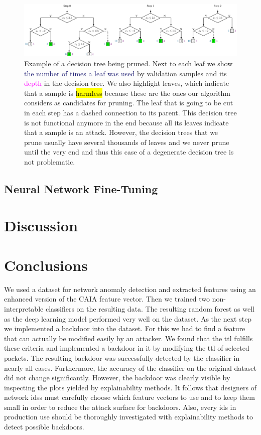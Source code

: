 \documentclass[10pt,sigconf,letterpaper,dvipsnames]{acmart}
\begin{document}
\begin{figure}[h]
\includegraphics[width=\textwidth]{pruning_example.pdf}

\caption{Example of a decision tree being pruned. Next to each leaf we show \textcolor{MidnightBlue}{the number of times a leaf was used} by validation samples and its \textcolor{Fuchsia}{depth} in the decision tree. We also highlight leaves, which indicate that a sample is \protect{} \hl{harmless} because these are the ones our algorithm considers as candidates for pruning. The leaf that is going to be cut in each step has a dashed connection to its parent. This decision tree is not functional anymore in the end because all its leaves indicate that a sample is an attack. However, the decision trees that we prune usually have several thousands of leaves and we never prune until the very end and thus this case of a degenerate decision tree is not problematic.}
\label{fig:pruningExample}
\end{figure}


\subsection{Neural Network Fine-Tuning}

\section{Discussion}


\section{Conclusions}

We used a dataset for network anomaly detection and extracted features using an enhanced version of the CAIA feature vector. Then we trained two non-interpretable classifiers on the resulting data. The resulting random forest as well as the deep learning model performed very well on the dataset. As the next step we implemented a backdoor into the dataset. For this we had to find a feature that can actually be modified easily by an attacker. We found that the \gls{ttl} fulfills these criteria and implemented a backdoor in it by modifying the  \gls{ttl} of selected packets. The resulting backdoor was successfully detected by the classifier in nearly all cases. Furthermore, the accuracy of the classifier on the original dataset did not change significantly. However, the backdoor was clearly visible by inspecting the plots yielded by explainability methods. It follows that designers of network \glspl{ids} must carefully choose which feature vectors to use and to keep them small in order to reduce the attack surface for backdoors. Also, every \gls{ids} in production use should be thoroughly investigated with explainability methods to detect possible backdoors.
\end{document}
